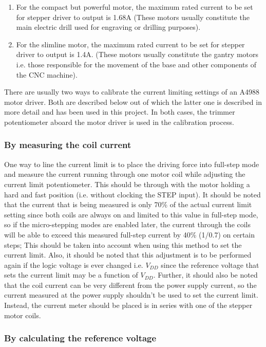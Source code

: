 \begin{enumerate}
 \item For the compact but powerful motor, the maximum rated current to be set for stepper driver to output is 1.68A (These motors usually constitute the main electric drill used for engraving or drilling purposes).
 \item For the slimline motor, the maximum rated current to be set for stepper driver to output is 1.4A. (These motors usually constitute the gantry motors i.e. those responsible for the movement of the base and other components of the CNC machine).
\end{enumerate}

There are usually two ways to calibrate the current limiting settings of an A4988 motor driver. Both are described below out of which the latter one is described in more detail and has been used in this project. In both cases, the trimmer potentiometer aboard the motor driver is used in the calibration process.

\subsubsection*{By measuring the coil current}

One way to line the current limit is to place the driving force into full-step mode and measure the current running through one motor coil while adjusting the current limit potentiometer. This should be through with the motor holding a hard and fast position (i.e. without clocking the STEP input). It should be noted that the current that is being measured is only 70\% of the actual current limit setting since both coils are always on and limited to this value in full-step mode, so if the micro-stepping modes are enabled later, the current through the coils will be able to exceed this measured full-step current by 40\% (1/0.7) on certain steps; This should be taken into account when using this method to set the current limit. Also, it should be noted that this adjustment is to be performed again if the logic voltage is ever changed i.e. $V_{DD}$ since the reference voltage that sets the current limit may be a function of $V_{DD}$. Further, it should also be noted that the coil current can be very different from the power supply current, so the current measured at the power supply shouldn’t be used to set the current limit. Instead, the current meter should be placed is in series with one of the stepper motor coils.

\subsubsection*{By calculating the reference voltage}

